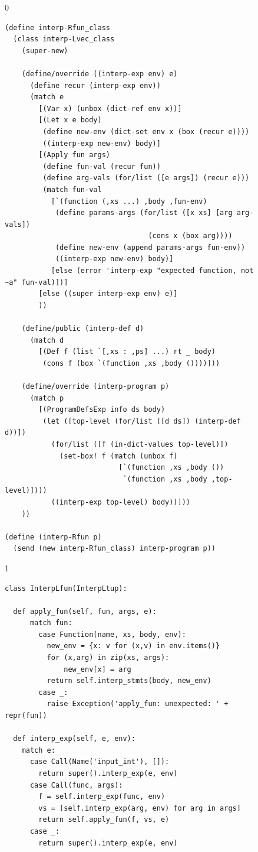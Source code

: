 \documentclass[7x10,nocrop]{TimesAPriori_MIT}%
\def\racketEd{0}
\def\pythonEd{1}
\def\edition{1}
\begin{document}
\begin{figure}[tp]
{\if\edition\racketEd  
\begin{lstlisting}
(define interp-Rfun_class
  (class interp-Lvec_class
    (super-new)

    (define/override ((interp-exp env) e)
      (define recur (interp-exp env))
      (match e
        [(Var x) (unbox (dict-ref env x))]
        [(Let x e body)
         (define new-env (dict-set env x (box (recur e))))
         ((interp-exp new-env) body)]
        [(Apply fun args)
         (define fun-val (recur fun))
         (define arg-vals (for/list ([e args]) (recur e)))
         (match fun-val
           [`(function (,xs ...) ,body ,fun-env)
            (define params-args (for/list ([x xs] [arg arg-vals])
                                  (cons x (box arg))))
            (define new-env (append params-args fun-env))
            ((interp-exp new-env) body)]
           [else (error 'interp-exp "expected function, not ~a" fun-val)])]
        [else ((super interp-exp env) e)]
        ))

    (define/public (interp-def d)
      (match d
        [(Def f (list `[,xs : ,ps] ...) rt _ body)
         (cons f (box `(function ,xs ,body ())))]))

    (define/override (interp-program p)
      (match p
        [(ProgramDefsExp info ds body)
         (let ([top-level (for/list ([d ds]) (interp-def d))])
           (for/list ([f (in-dict-values top-level)])
             (set-box! f (match (unbox f)
                           [`(function ,xs ,body ())
                            `(function ,xs ,body ,top-level)])))
           ((interp-exp top-level) body))]))
    ))

(define (interp-Rfun p)
  (send (new interp-Rfun_class) interp-program p))
\end{lstlisting}
\fi}
{\if\edition\pythonEd
\begin{lstlisting}
class InterpLfun(InterpLtup):
  
  def apply_fun(self, fun, args, e):
      match fun:
        case Function(name, xs, body, env):
          new_env = {x: v for (x,v) in env.items()}
          for (x,arg) in zip(xs, args):
              new_env[x] = arg
          return self.interp_stmts(body, new_env)
        case _:
          raise Exception('apply_fun: unexpected: ' + repr(fun))
    
  def interp_exp(self, e, env):
    match e:
      case Call(Name('input_int'), []):
        return super().interp_exp(e, env)      
      case Call(func, args):
        f = self.interp_exp(func, env)
        vs = [self.interp_exp(arg, env) for arg in args]
        return self.apply_fun(f, vs, e)
      case _:
        return super().interp_exp(e, env)


\end{lstlisting}}
\end{figure}
\end{document}
